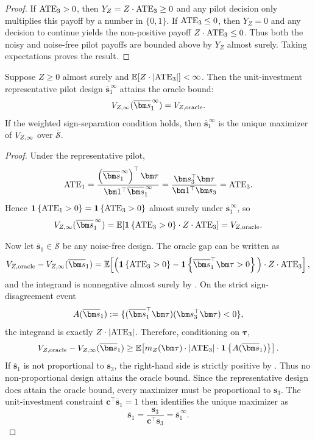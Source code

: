 \begin{proof}
  If $\mathrm{ATE}_3>0$, then $Y_Z=Z\cdot \mathrm{ATE}_3\ge0$ and any pilot decision only multiplies this payoff by a number in $\{0,1\}$.
  If $\mathrm{ATE}_3\le0$, then $Y_Z=0$ and any decision to continue yields the non-positive payoff $Z\cdot \mathrm{ATE}_3\le0$.
  Thus both the noisy and noise-free pilot payoffs are bounded above by $Y_Z$ almost surely.
  Taking expectations proves the result.
\end{proof}

\begin{proposition}
  \label{prop:optimal-noise-free-pilot-design-weighted-appendix}
  Suppose $Z\ge0$ almost surely and $\mathbb{E}[Z\cdot|\mathrm{ATE}_3|]<\infty$.
  Then the unit-investment representative pilot design $\overline{\bm s}_1^{\,\infty}$ attains the oracle bound:
  \[
    V_{Z,\noisefree}(\overline{\bm s}_1^{\,\infty})
    =
    V_{Z,\oracle}.
  \]
  If the weighted sign-separation condition  holds, then $\overline{\bm s}_1^{\,\infty}$ is the unique maximizer of $V_{Z,\infty}$ over $\overline{\mathcal{S}}$.
\end{proposition}

\begin{proof}
  Under the representative pilot,
  \[
    \ATE_1
    =
    \frac{\left(\overline{\bm s}_1^{\,\infty}\right)^\top\bm\tau}
    {\bm1^\top\overline{\bm s}_1^{\,\infty}}
    =
    \frac{\bm s_3^\top\bm\tau}{\bm1^\top\bm s_3}
    =
    \ATE_3.
  \]
  Hence $\mathbf{1}\left\{\mathrm{ATE}_1>0\right\}=\mathbf{1}\left\{\mathrm{ATE}_3>0\right\}$ almost surely under $\overline{\bm s}_1^{\,\infty}$, so
  \[
    V_{Z,\noisefree}(\overline{\bm s}_1^{\,\infty})
    =
    \E[\indic{\ATE_3>0}\cdot Z\cdot \ATE_3]
    =
    V_{Z,\oracle}.
  \]

  Now let $\overline{\bm s}_1\in\overline{\mathcal{S}}$ be any noise-free design.
  The oracle gap can be written as
  \[
    V_{Z,\oracle}-V_{Z,\noisefree}(\overline{\bm s}_1)
    =
    \E\!\left[
      \Big(
        \indic{\ATE_3>0}
        -
        \indic{\overline{\bm s}_1^\top\bm\tau>0}
      \Big)\cdot Z \cdot \ATE_3
    \right],
  \]
  and the integrand is nonnegative almost surely by .
  On the strict sign-disagreement event
  \[
    A(\overline{\bm s}_1)
    \defeq
    \{(\overline{\bm s}_1^\top\bm\tau)(\bm s_3^\top\bm\tau)<0\},
  \]
  the integrand is exactly $Z\cdot|\mathrm{ATE}_3|$.
  Therefore, conditioning on $\bm\tau$,
  \[
    V_{Z,\oracle}-V_{Z,\noisefree}(\overline{\bm s}_1)
    \ge
    \E\!\left[
      m_Z(\bm\tau)\cdot |\ATE_3|\cdot \indic{A(\overline{\bm s}_1)}
    \right].
  \]
  If $\overline{\bm s}_1$ is not proportional to $\bm s_3$, the right-hand side is strictly positive by .
  Thus no non-proportional design attains the oracle bound.
  Since the representative design does attain the oracle bound, every maximizer must be proportional to $\bm s_3$.
  The unit-investment constraint $\bm c^\top\overline{\bm s}_1=1$ then identifies the unique maximizer as
  \[
    \overline{\bm s}_1
    =
    \frac{\bm s_3}{\bm c^\top\bm s_3}
    =
    \overline{\bm s}_1^{\,\infty}.
  \]
\end{proof}

